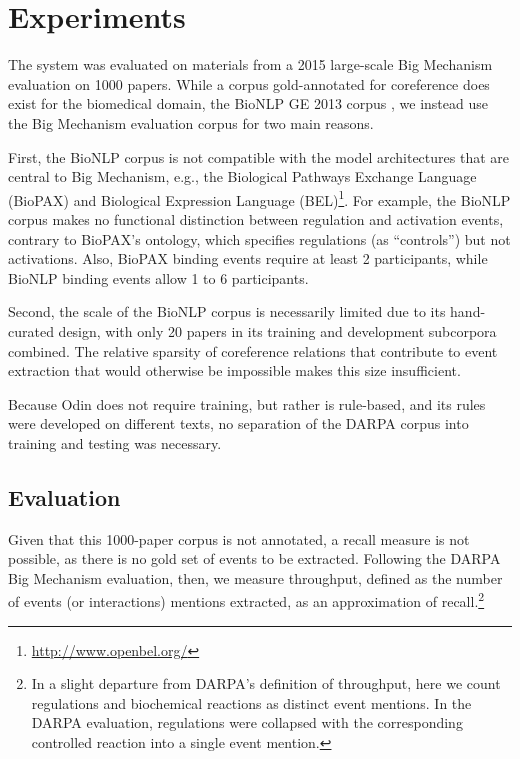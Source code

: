 \section{Experiments}

The system was evaluated on materials from a 2015 large-scale Big Mechanism evaluation on 1000 papers. While a corpus
gold-annotated for coreference does exist for the biomedical domain, the BioNLP GE 2013 corpus \cite{kim2013ge}, we instead use the Big Mechanism evaluation corpus for two main reasons. 

First, the BioNLP corpus is not compatible with the model architectures that are central to Big Mechanism, e.g., the Biological 
Pathways Exchange Language (BioPAX) \cite{Biopax} and Biological Expression Language (BEL)\footnote{\url{http://www.openbel.org/}}.
For example, the 
BioNLP corpus makes no functional distinction between regulation and activation events, contrary to BioPAX's ontology, which 
specifies regulations (as ``controls'') but not activations. Also, BioPAX binding events require at least 2 participants, while 
BioNLP binding events allow 1 to 6 participants.

Second, the 
scale of the BioNLP corpus is necessarily limited due to its hand-curated design, with only 20 papers in its training and 
development subcorpora combined. The relative sparsity of coreference relations that contribute to event extraction 
that would otherwise be impossible makes this size insufficient. 

Because Odin does not require training, but rather is rule-based, and its rules were developed on different texts, no separation of the DARPA corpus into training and testing was necessary.

\subsection{Evaluation}
\label{sec:exp}


Given that this 1000-paper corpus is not annotated, a recall measure is not possible, as there is no gold set of events to be 
extracted. Following the DARPA Big Mechanism evaluation, then, we measure throughput, defined as the number of events (or interactions) mentions extracted, as an approximation of recall.\footnote{In a slight departure from DARPA's definition of throughput, here we count regulations and biochemical reactions as distinct event mentions. In the DARPA evaluation, regulations were collapsed with the corresponding controlled reaction into a single event mention.}

